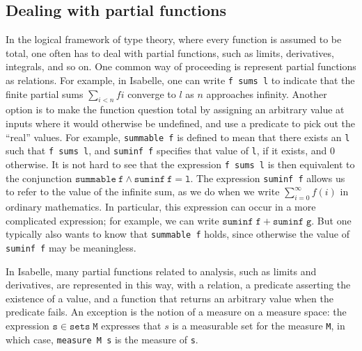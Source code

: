 \documentclass{svjour3}
\begin{document}
\subsection{Dealing with partial functions}
\label{subsection:partial}

In the logical framework of type theory, where every function is assumed to be total, one often has to deal with partial functions, such as limits, derivatives, integrals, and so on. One common way of proceeding is represent partial functions as relations. For example, in Isabelle, one can write \texttt{f~sums~l} to indicate that the finite partial sums $\sum_{i < n} f i$ converge to $l$ as $n$ approaches infinity. Another option is to make the function question total by assigning an arbitrary value at inputs where it would otherwise be undefined, and use a predicate to pick out the ``real'' values. For example, \texttt{summable f} is defined to mean that there exists an \texttt{l} such that \texttt{f sums l}, and \texttt{suminf f} specifies that value of \texttt{l}, if it exists, and $0$ otherwise. It is not hard to see that the expression \texttt{f sums l} is then equivalent to the conjunction $\mathtt{summable~f} \wedge \mathtt{suminf~f } = \mathtt{l}$. The expression \texttt{suminf f} allows us to refer to the value of the infinite sum, as we do when we write $\sum_{i = 0}^\infty f(i)$ in ordinary mathematics. In particular, this expression can occur in a more complicated expression; for example, we can write $\mathtt{suminf \; f} + \mathtt{suminf \; g}$. But one typically also wants to know that \texttt{summable f} holds, since otherwise the value of \texttt{suminf f} may be meaningless.

In Isabelle, many partial functions related to analysis, such as limits and derivatives, are represented in this way, with a relation, a predicate asserting the existence of a value, and a function that returns an arbitrary value when the predicate fails. An exception is the notion of a measure on a measure space: the expression $\mathtt{s} \in \mathtt{sets \; M}$ expresses that $s$ is a measurable set for the measure \texttt{M}, in which case, \texttt{measure M s} is the measure of \texttt{s}.
\end{document}
